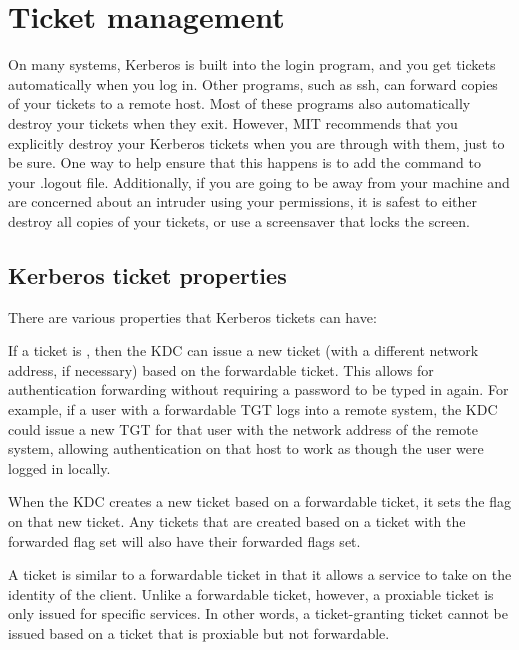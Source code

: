 \documentclass[letterpaper,10pt,english]{sphinxmanual}
\begin{document}
\chapter{Ticket management}
\label{\detokenize{user/tkt_mgmt:ticket-management}}\label{\detokenize{user/tkt_mgmt::doc}}
On many systems, Kerberos is built into the login program, and you get
tickets automatically when you log in.  Other programs, such as ssh,
can forward copies of your tickets to a remote host.  Most of these
programs also automatically destroy your tickets when they exit.
However, MIT recommends that you explicitly destroy your Kerberos
tickets when you are through with them, just to be sure.  One way to
help ensure that this happens is to add the {\hyperref[\detokenize{user/user_commands/kdestroy:kdestroy-1}]{}} command
to your .logout file.  Additionally, if you are going to be away from
your machine and are concerned about an intruder using your
permissions, it is safest to either destroy all copies of your
tickets, or use a screensaver that locks the screen.


\section{Kerberos ticket properties}
\label{\detokenize{user/tkt_mgmt:kerberos-ticket-properties}}
There are various properties that Kerberos tickets can have:

If a ticket is , then the KDC can issue a new ticket
(with a different network address, if necessary) based on the
forwardable ticket.  This allows for authentication forwarding without
requiring a password to be typed in again.  For example, if a user
with a forwardable TGT logs into a remote system, the KDC could issue
a new TGT for that user with the network address of the remote system,
allowing authentication on that host to work as though the user were
logged in locally.

When the KDC creates a new ticket based on a forwardable ticket, it
sets the  flag on that new ticket.  Any tickets that are
created based on a ticket with the forwarded flag set will also have
their forwarded flags set.

A  ticket is similar to a forwardable ticket in that it
allows a service to take on the identity of the client.  Unlike a
forwardable ticket, however, a proxiable ticket is only issued for
specific services.  In other words, a ticket-granting ticket cannot be
issued based on a ticket that is proxiable but not forwardable.
\end{document}
